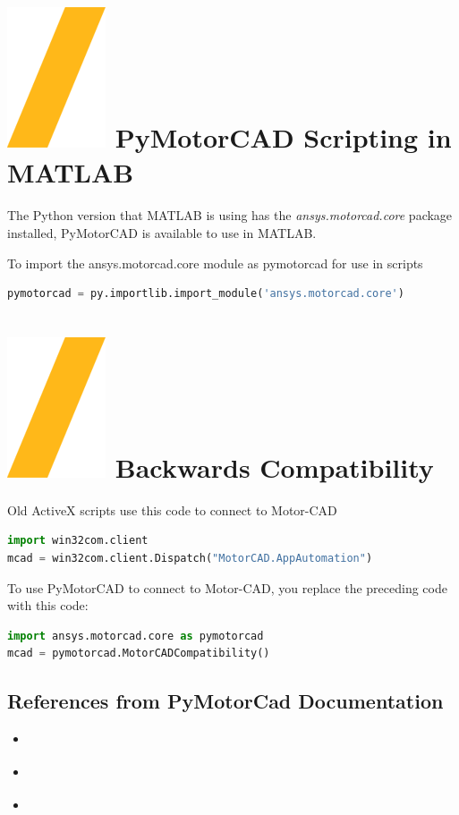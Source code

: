 \documentclass[landscape]{article}
\begin{document}
\begin{multicols}{3}
\section{\includegraphics[height=\fontcharht\font`\S]{slash.png} PyMotorCAD Scripting in MATLAB}
The Python version that MATLAB is using has the \textit{ansys.motorcad.core} package installed, PyMotorCAD is available to use in MATLAB.

To import the ansys.motorcad.core module as pymotorcad for use in scripts
\begin{lstlisting}[language=Python]
pymotorcad = py.importlib.import_module('ansys.motorcad.core')	
\end{lstlisting}

\section{\includegraphics[height=\fontcharht\font`\S]{slash.png} Backwards Compatibility}
Old ActiveX scripts use this code to connect to Motor-CAD
\begin{lstlisting}[language=Python]
import win32com.client
mcad = win32com.client.Dispatch("MotorCAD.AppAutomation")
\end{lstlisting}
To use PyMotorCAD to connect to Motor-CAD, you replace the preceding code with this code:	
\begin{lstlisting}[language=Python]
import ansys.motorcad.core as pymotorcad
mcad = pymotorcad.MotorCADCompatibility()
\end{lstlisting}	


\subsection{References from PyMotorCad Documentation}
\begin{itemize}
\item \href{https://motorcad.docs.pyansys.com/version/stable/getting_started/index.html}{\color{blue}{Getting Started}}
\item \href{https://motorcad.docs.pyansys.com/version/stable/examples/index.html}{\color{blue}{Examples}}
\item \href{https://motorcad.docs.pyansys.com/version/stable/methods/index.html}{\color{blue}{API Reference}}
\end{itemize}
\end{multicols}
\end{document}
